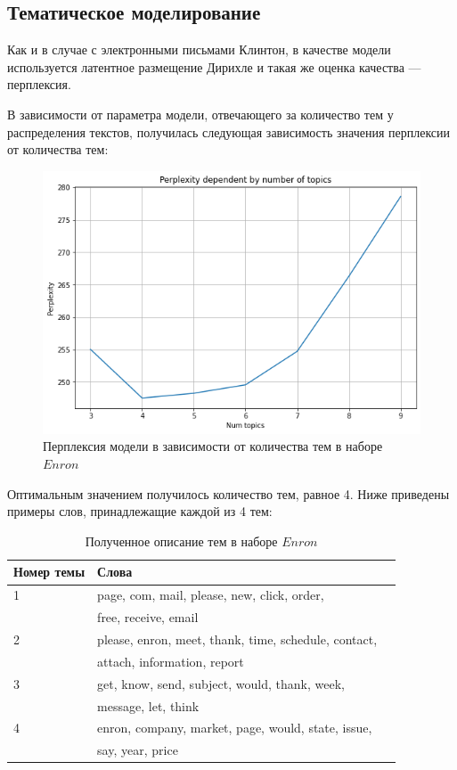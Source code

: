 \subsection{Тематическое моделирование}

Как и в случае с электронными письмами Клинтон, в качестве модели используется латентное размещение Дирихле и такая же оценка качества --- перплексия.

В зависимости от параметра модели, отвечающего за количество тем у
распределения текстов, получилась следующая зависимость значения перплексии 
от количества тем:

\begin{figure}[H]
\centering
\includegraphics[scale=0.5]{pics/perplexity-2.png}
\caption{Перплексия модели в зависимости от количества тем в наборе $Enron$}
\end{figure}

Оптимальным значением получилось количество тем, равное 4. Ниже приведены примеры слов, принадлежащие каждой из 4 тем:

\begin{table}[H]
\centering
\begin{tabular}{ | l | l | l | }
\hline
Номер темы & Слова \\ \hline
1 & page, com, mail, please, new, click, order, 
\\ & free, receive, email \\ \hline
2 & please, enron, meet, thank, time, schedule, contact, 
\\ & attach, information, report \\ \hline
3 & get, know, send, subject, would, thank, week,
 \\ & message, let, think \\ \hline
4 & enron, company, market, page, would, state, issue, 
 \\ &  say, year, price \\ \hline 
\end{tabular}
\caption{Полученное описание тем в наборе $Enron$}
\end{table} 

